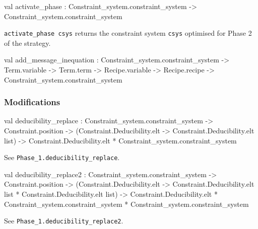 \begin{ocamldocsigend}


\label{val:Constraint-underscoresystem.Phase-underscore2.activate-underscorephase}\begin{ocamldoccode}
val activate_phase :
  Constraint_system.constraint_system -> Constraint_system.constraint_system
\end{ocamldoccode}
\begin{ocamldocdescription}
{\tt{activate\_phase csys}} returns the constraint system {\tt{csys}} optimised for Phase 2 of the strategy.


\end{ocamldocdescription}


\label{val:Constraint-underscoresystem.Phase-underscore2.add-underscoremessage-underscoreinequation}\begin{ocamldoccode}
val add_message_inequation :
  Constraint_system.constraint_system ->
  Term.variable ->
  Term.term ->
  Recipe.variable -> Recipe.recipe -> Constraint_system.constraint_system
\end{ocamldoccode}


\subsubsection{Modifications}


\label{val:Constraint-underscoresystem.Phase-underscore2.deducibility-underscorereplace}\begin{ocamldoccode}
val deducibility_replace :
  Constraint_system.constraint_system ->
  Constraint.position ->
  (Constraint.Deducibility.elt -> Constraint.Deducibility.elt list) ->
  Constraint.Deducibility.elt * Constraint_system.constraint_system
\end{ocamldoccode}
\begin{ocamldocdescription}
See {\tt{Phase\_1.deducibility\_replace}}.


\end{ocamldocdescription}


\label{val:Constraint-underscoresystem.Phase-underscore2.deducibility-underscorereplace2}\begin{ocamldoccode}
val deducibility_replace2 :
  Constraint_system.constraint_system ->
  Constraint.position ->
  (Constraint.Deducibility.elt ->
   Constraint.Deducibility.elt list * Constraint.Deducibility.elt list) ->
  Constraint.Deducibility.elt * Constraint_system.constraint_system *
  Constraint_system.constraint_system
\end{ocamldoccode}
\begin{ocamldocdescription}
See {\tt{Phase\_1.deducibility\_replace2}}.



\end{ocamldocdescription}
\end{ocamldocsigend}
